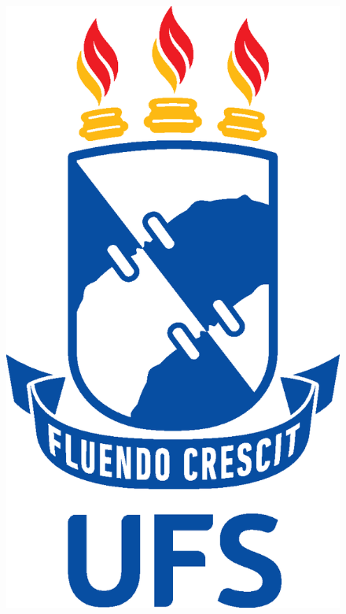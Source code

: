 \begin{figure}[!h]
\centering
	\includegraphics[scale=0.2]{ufs_vertical_positiva.eps}
\end{figure}
\vspace{-0.5cm}
